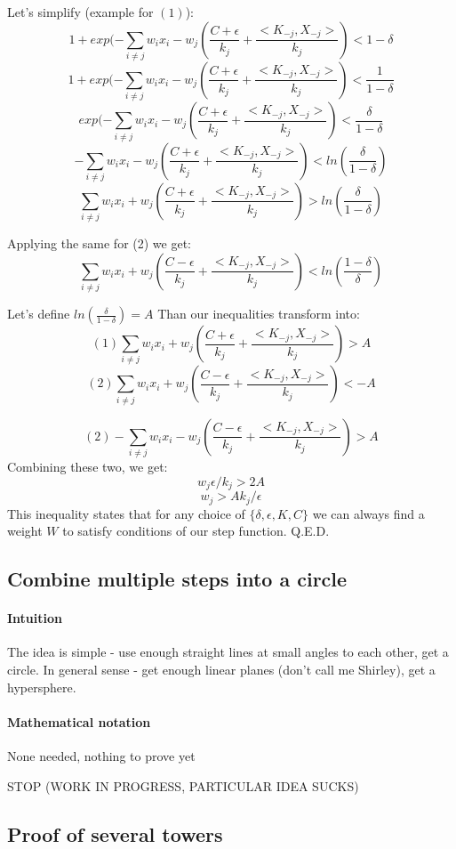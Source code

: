 \documentclass{article}
\begin{document}
Let's simplify (example for $(1)$):
$$1 + exp(- \sum_{i \neq j}w_ix_i - w_j (\frac{C + \epsilon}{k_j} + \frac{<K_{-j} , X_{-j}>}{k_j}) < 1-\delta$$
$$1 + exp(- \sum_{i \neq j}w_ix_i - w_j (\frac{C + \epsilon}{k_j} + \frac{<K_{-j} , X_{-j}>}{k_j}) < \frac{1}{1-\delta}$$
$$exp(- \sum_{i \neq j}w_ix_i - w_j (\frac{C + \epsilon}{k_j} + \frac{<K_{-j} , X_{-j}>}{k_j}) < \frac{\delta}{1-\delta}$$
$$- \sum_{i \neq j}w_ix_i - w_j (\frac{C + \epsilon}{k_j} + \frac{<K_{-j} , X_{-j}>}{k_j}) < ln(\frac{\delta}{1-\delta})$$
$$\sum_{i \neq j}w_ix_i + w_j (\frac{C + \epsilon}{k_j} + \frac{<K_{-j} , X_{-j}>}{k_j}) > ln(\frac{\delta}{1-\delta})$$

Applying the same for (2) we get:
$$\sum_{i \neq j}w_ix_i + w_j (\frac{C - \epsilon}{k_j} + \frac{<K_{-j} , X_{-j}>}{k_j}) < ln(\frac{1-\delta}{\delta})$$

Let's define $ln(\frac{\delta}{1-\delta}) = A$
Than our inequalities transform into:
$$(1)\sum_{i \neq j}w_ix_i + w_j (\frac{C + \epsilon}{k_j} + \frac{<K_{-j} , X_{-j}>}{k_j}) > A $$
$$(2)\sum_{i \neq j}w_ix_i + w_j (\frac{C - \epsilon}{k_j} + \frac{<K_{-j} , X_{-j}>}{k_j}) < -A $$

$$(2) - \sum_{i \neq j}w_ix_i - w_j (\frac{C - \epsilon}{k_j} + \frac{<K_{-j} , X_{-j}>}{k_j}) > A $$
Combining these two, we get:
$$ w_j\epsilon/k_j > 2A$$
$$ w_j > A k_j/\epsilon$$
This inequality states that for any choice of $\{\delta, \epsilon, K, C\}$ we can always find a weight $W$ to satisfy conditions of our step function.
Q.E.D.

\subsection{Combine multiple steps into a circle}
\paragraph{Intuition}
The idea is simple - use enough straight lines at small angles to each other, get a circle.
In general sense - get enough linear planes (don't call me Shirley), get a hypersphere.

\paragraph{Mathematical notation}
None needed, nothing to prove yet



STOP (WORK IN PROGRESS, PARTICULAR IDEA SUCKS)
\subsection{Proof of several towers}
\end{document}
